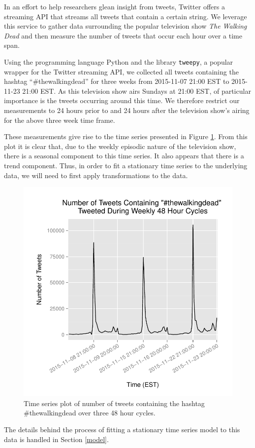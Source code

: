 In an effort to help researchers glean insight from tweets, Twitter offers
a streaming API that streams all tweets that contain a certain string.
We leverage this service to gather data surrounding the popular television
show \textit{The Walking Dead} and then measure the number of tweets that occur each
hour over a time span.

Using the programming language Python and the library \texttt{tweepy}, a popular
wrapper for the Twitter streaming API, we collected all tweets containing the
hashtag ``\#thewalkingdead'' for three weeks from 2015-11-07 21:00 EST to
2015-11-23 21:00 EST. As this television show airs Sundays at 21:00 EST,
of particular importance is the tweets occurring around this time.
We therefore restrict our measurements to 24 hours prior to and 24 hours after
the television show's airing for the above three week time frame.

These measurements give rise to the time series presented in Figure \ref{tweets_plot}.
From this plot it is clear that, due to the weekly episodic nature of the television
show, there is a seasonal component to this time series. It also appears that
there is a trend component. Thus, in order to fit a stationary time series
to the underlying data, we will need to first apply transformations to the data.

\begin{figure}[!h]
  \centerline{\includegraphics[scale=0.75]{../analysis/plots/tweets_plot}}
  \caption{Time series plot of number of tweets containing the hashtag
  \#thewalkingdead over three 48 hour cycles.}\label{tweets_plot}
\end{figure}

The details behind the process of fitting a stationary time series model to this data is handled in
Section \ref{model}.